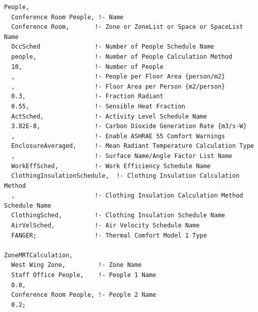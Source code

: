 \begin{lstlisting}
People,
  Conference Room People, !- Name
  Conference Room,       !- Zone or ZoneList or Space or SpaceList Name
  OccSched               !- Number of People Schedule Name
  people,                !- Number of People Calculation Method
  10,                    !- Number of People
  ,                      !- People per Floor Area {person/m2}
  ,                      !- Floor Area per Person {m2/person}
  0.3,                   !- Fraction Radiant
  0.55,                  !- Sensible Heat Fraction
  ActSched,              !- Activity Level Schedule Name
  3.82E-8,               !- Carbon Dioxide Generation Rate {m3/s-W}
  ,                      !- Enable ASHRAE 55 Comfort Warnings
  EnclosureAveraged,     !- Mean Radiant Temperature Calculation Type
  ,                      !- Surface Name/Angle Factor List Name
  WorkEffSched,          !- Work Efficiency Schedule Name
  ClothingInsulationSchedule,  !- Clothing Insulation Calculation Method
  ,                      !- Clothing Insulation Calculation Method Schedule Name
  ClothingSched,         !- Clothing Insulation Schedule Name
  AirVelSched,           !- Air Velocity Schedule Name
  FANGER;                !- Thermal Comfort Model 1 Type

ZoneMRTCalculation,
  West Wing Zone,         !- Zone Name
  Staff Office People,    !- People 1 Name
  0.8,
  Conference Room People, !- People 2 Name
  0.2;
\end{lstlisting}
